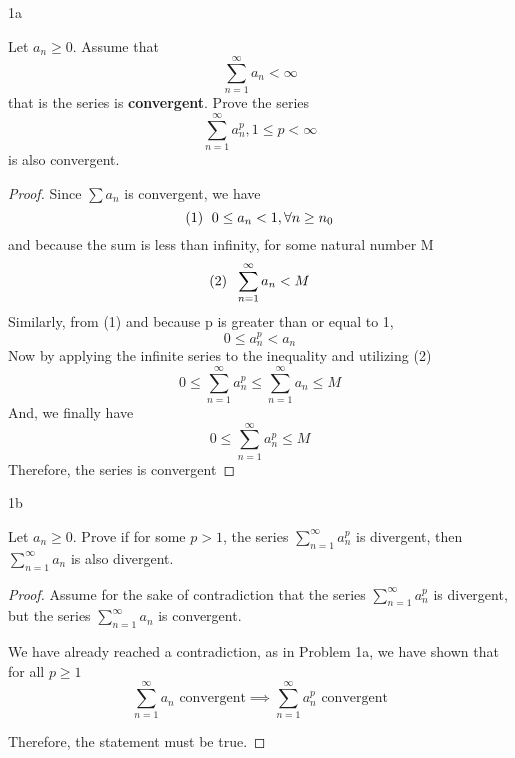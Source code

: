 \documentclass[boxes]{rutgers_hw}
\author{Rohan Karamel}
\date{\today}
\begin{document}
  \maketitle


  \begin{exern}{1a}
    
    Let $a_n \ge 0$. Assume that
    \[ \sum_{n=1}^\infty a_n < \infty\]
    that is the series is \textbf{convergent}. Prove the series
    \[ \sum_{n=1}^\infty a_n^p, 1 \le p < \infty\]
    is also convergent.

  \end{exern}

  \begin{proof}

    Since $\sum a_n$ is convergent, we have 
    \[ \text{(1) \hspace{1 mm}} 0 \le a_n < 1, \forall n \ge n_0\]
    and because the sum is less than infinity, for some natural number M
    \[ \text{(2) \hspace{1 mm}}\sum_{n=1}^\infty a_n < M \]
    Similarly, from (1) and because p is greater than or equal to 1,
    \[ 0 \le a_n^p < a_n \]
    Now by applying the infinite series to the inequality and utilizing (2)
    \[ 0 \le \sum_{n=1}^\infty a_n^p \le \sum_{n=1}^\infty a_n \le M\]
    And, we finally have
    \[ 0 \le \sum_{n=1}^\infty a_n^p  \le M\]
    Therefore, the series is convergent

  \end{proof}

  
  \begin{exern}{1b}
    
    Let $a_n \ge 0$. Prove if for some $p > 1$, the series $\sum_{n=1}^\infty a_n^p$ is divergent,
    then $\sum_{n=1}^\infty a_n$ is also divergent.

  \end{exern}

  \begin{proof}

    Assume for the sake of contradiction that the series $\sum_{n=1}^\infty a_n^p$ is divergent, 
    but the series $\sum_{n=1}^\infty a_n$ is convergent.

    We have already reached a contradiction, as in Problem 1a, we have shown that for all $p \ge 1$
    \[\sum_{n=1}^\infty a_n \text{ convergent} \implies \sum_{n=1}^\infty a_n^p \text{ convergent}\]
    
    Therefore, the statement must be true.

  \end{proof}
\end{document}
